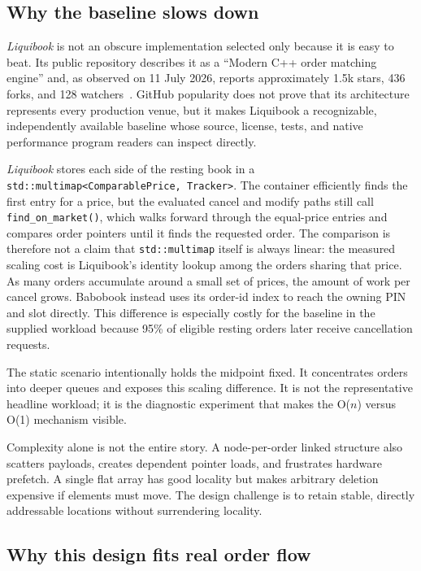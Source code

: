 \documentclass[10pt,twocolumn]{article}
\begin{document}
\subsection{Why the baseline slows down}

\textit{Liquibook} is not an obscure implementation selected only because it is
easy to beat.  Its public repository describes it as a ``Modern C++ order
matching engine'' and, as observed on 11 July 2026, reports approximately 1.5k
stars, 436 forks, and 128 watchers~\cite{liquibook}.  GitHub popularity does not
prove that its architecture represents every production venue, but it makes
Liquibook a recognizable, independently available baseline whose source,
license, tests, and native performance program readers can inspect directly.

\textit{Liquibook} stores each side of the resting book in a
\texttt{std::multimap<ComparablePrice, Tracker>}.  The container efficiently
finds the first entry for a price, but the evaluated cancel and modify paths
still call \texttt{find\_on\_market()}, which walks forward through the
equal-price entries and compares order pointers until it finds the requested
order.  The comparison is therefore not a claim that \texttt{std::multimap}
itself is always linear: the measured scaling cost is Liquibook's identity
lookup among the orders sharing that price.  As many orders accumulate around
a small set of prices, the amount of work per cancel grows.  Babobook instead
uses its order-id index to reach the owning PIN and slot directly.  This
difference is especially costly for the baseline in the supplied workload
because 95\% of eligible resting orders later receive cancellation requests.

The static scenario intentionally holds the midpoint fixed.  It concentrates
orders into deeper queues and exposes this scaling difference.  It is not the
representative headline workload; it is the diagnostic experiment that makes
the O($n$) versus O(1) mechanism visible.

Complexity alone is not the entire story.  A node-per-order linked structure
also scatters payloads, creates dependent pointer loads, and frustrates hardware
prefetch.  A single flat array has good locality but makes arbitrary deletion
expensive if elements must move.  The design challenge is to retain stable,
directly addressable locations without surrendering locality.

\subsection{Why this design fits real order flow}
\end{document}

